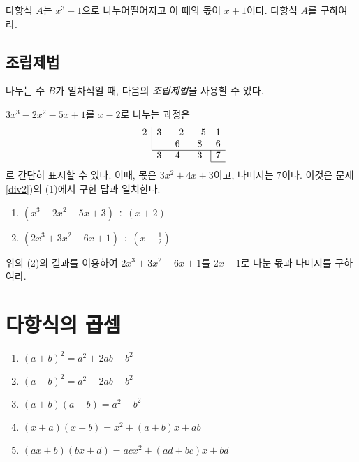 \documentclass{oblivoir}
\begin{document}
%
\prob{}
\label{div3}
다항식 \(A\)는 \(x^3+1\)으로 나누어떨어지고 이 때의 몫이 \(x+1\)이다.
다항식 \(A\)를 구하여라.

\clearpage
\subsection{조립제법}
나누는 수 \(B\)가 일차식일 때, 다음의 \emph{조립제법}을 사용할 수 있다.

%
\exam{}
\(3x^3-2x^2-5x+1\)를 \(x-2\)로 나누는 과정은
\begin{equation*}
\begin{array}{ccccc}
\multicolumn{1}{c|}{2}	&3	&-2	&-5	&1\\
\multicolumn{1}{c|}{}		&	&6	&8	&6\\
\cline{2-5}
							&3	&4	&3	&\multicolumn1{|c}{7}\\
\cline{5-5}
\end{array}
\end{equation*}
로 간단히 표시할 수 있다.
이때, 몫은 \(3x^2+4x+3\)이고, 나머지는 \(7\)이다.
이것은 문제 \ref{div2})의 (1)에서 구한 답과 일치한다.

%
\begin{enumerate}\label{div4}
\item
\((x^3-2x^2-5x+3)\div(x+2)\)
\item
\((2x^3+3x^2-6x+1)\div(x-\frac12)\)
\end{enumerate}

%
\prob{}\label{div5}
위의 (2)의 결과를 이용하여 \(2x^3+3x^2-6x+1\)를 \(2x-1\)로 나눈 몫과 나머지를 구하여라.


\section{다항식의 곱셈}

%
\begin{mdframed}
\begin{enumerate}
\item\label{mult_01}
\((a+b)^2=a^2+2ab+b^2\)
\item\label{mult_02}
\((a-b)^2=a^2-2ab+b^2\)
\item\label{mult_03}
\((a+b)(a-b)=a^2-b^2\)
\item\label{mult_04}
\((x+a)(x+b)=x^2+(a+b)x+ab\)
\item\label{mult_05}
\((ax+b)(bx+d)=acx^2+(ad+bc)x+bd\)
\end{enumerate}
\end{mdframed}
\end{document}
